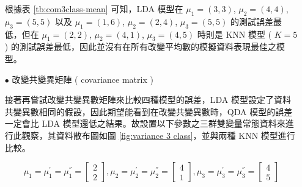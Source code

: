 \begin{itemize}
\renewcommand\arraystretch{1.5}
\begin{table}[h]
\scriptsize
\setlength{\belowcaptionskip}{0pt}
\centering
\caption{Error Rate of three Methods of changing mean vector for three classes}\label{tb:com3class-mean}
\end{table}

根據表 \ref{tb:com3class-mean} 可知，LDA 模型在 $\mu_1=(3,3)$, $\mu_2=(4,4)$, $\mu_3=(5,5)$ 以及 $\mu_1=(1,6)$, $\mu_2=(2,4)$, $\mu_3=(5,5)$ 的測試誤差最低，但在 $\mu_1=(2,2)$, $\mu_2=(4,1)$, $\mu_3=(4,5)$ 時則是 KNN 模型 ( $K=5$ ) 的測試誤差最低，因此並沒有在所有改變平均數的模擬資料表現最佳之模型。

\item[$\bullet$] 改變共變異矩陣 ( covariance matrix )

接著再嘗試改變共變異數矩陣來比較四種模型的誤差，LDA 模型設定了資料共變異數相同的假設，因此期望能看到在改變共變異數時，QDA 模型的誤差一定會比 LDA 模型還低之結果。故設置以下參數之三群雙變量常態資料來進行此觀察，其資料散布圖如圖 \ref{fig:variance 3 class}，並與兩種 KNN 模型進行比較。

$$ \mu_1=\mu_1^{'}=\mu_1^{''} = \left[
            \begin{array}{clr}
                2  \\
                2 
            \end{array} \right] ,
            \mu_2=\mu_2^{'} =\mu_2^{''}= \left[
            \begin{array}{clr}
                4  \\
                1 
            \end{array} \right],
            \mu_3=\mu_3^{'}=\mu_3^{''} = \left[
            \begin{array}{clr}
                4  \\
                5 
            \end{array} \right]$$ 


\end{itemize}
